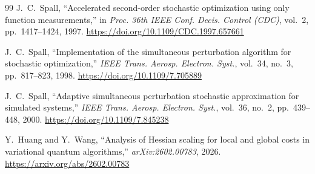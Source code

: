 \documentclass[11pt,a4paper]{article}
\begin{document}
\begin{thebibliography}{99}
J.~C.~Spall,
\newblock ``Accelerated second-order stochastic optimization using only function measurements,''
\newblock in \emph{Proc. 36th IEEE Conf. Decis. Control (CDC)}, vol.~2, pp.~1417--1424, 1997. \url{https://doi.org/10.1109/CDC.1997.657661}

J.~C.~Spall,
\newblock ``Implementation of the simultaneous perturbation algorithm for stochastic optimization,''
\newblock \emph{IEEE Trans. Aerosp. Electron. Syst.}, vol.~34, no.~3, pp.~817--823, 1998. \url{https://doi.org/10.1109/7.705889}

J.~C.~Spall,
\newblock ``Adaptive simultaneous perturbation stochastic approximation for simulated systems,''
\newblock \emph{IEEE Trans. Aerosp. Electron. Syst.}, vol.~36, no.~2, pp.~439--448, 2000. \url{https://doi.org/10.1109/7.845238}

Y.~Huang and Y.~Wang,
\newblock ``Analysis of Hessian scaling for local and global costs in variational quantum algorithms,''
\newblock \emph{arXiv:2602.00783}, 2026. \url{https://arxiv.org/abs/2602.00783}

\end{thebibliography}
\end{document}
